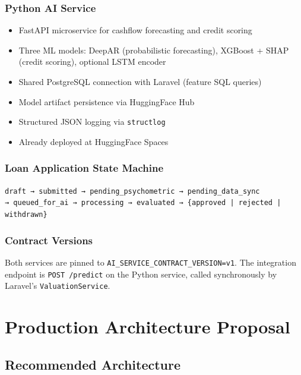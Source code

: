 \documentclass[12pt,a4paper]{report}
\begin{document}
\subsection{Python AI Service}

\begin{itemize}[leftmargin=1.5em]
    \item FastAPI microservice for cashflow forecasting and credit scoring
    \item Three ML models: DeepAR (probabilistic forecasting),
          XGBoost + SHAP (credit scoring), optional LSTM encoder
    \item Shared PostgreSQL connection with Laravel (feature SQL queries)
    \item Model artifact persistence via HuggingFace Hub
    \item Structured JSON logging via \texttt{structlog}
    \item Already deployed at HuggingFace Spaces
\end{itemize}

\subsection{Loan Application State Machine}

\begin{center}
\small
\texttt{draft → submitted → pending\_psychometric → pending\_data\_sync}\\
\texttt{→ queued\_for\_ai → processing → evaluated → \{approved | rejected | withdrawn\}}
\end{center}

\subsection{Contract Versions}

Both services are pinned to \texttt{AI\_SERVICE\_CONTRACT\_VERSION=v1}.
The integration endpoint is \texttt{POST /predict} on the Python service,
called synchronously by Laravel's \texttt{ValuationService}.

\chapter{Production Architecture Proposal}
\label{ch:architecture}

\section{Recommended Architecture}
\end{document}
